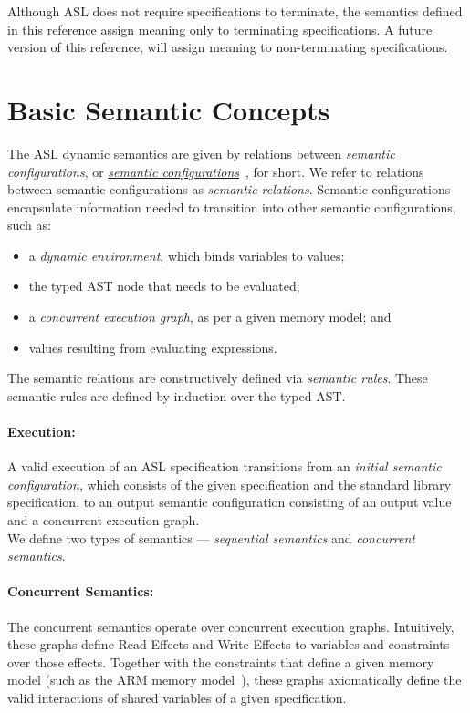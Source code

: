 Although ASL does not require specifications to terminate, the semantics defined in this
reference assign meaning only to terminating specifications.
A future version of this reference, will assign meaning to non-terminating specifications.

\section{Basic Semantic Concepts}
The ASL dynamic semantics are given by relations between \emph{semantic configurations},
or \hyperlink{def-configuration}{\emph{semantic configurations}}~\cite{SemanticsWithApplicationsBook}, for short.
We refer to relations between semantic configurations as \emph{semantic relations}.
Semantic configurations encapsulate information needed to transition into other semantic configurations, such as:
\begin{itemize}
  \item a \emph{dynamic environment}, which binds variables to values;
  \item the typed AST node that needs to be evaluated;
  \item a \emph{concurrent execution graph}, as per a given memory model; and
  \item values resulting from evaluating expressions.
\end{itemize}
The semantic relations are constructively defined via \emph{semantic rules}.
These semantic rules are defined by induction over the typed AST.

\paragraph{Execution:}
A valid execution of an ASL specification transitions from an \emph{initial semantic configuration},
which consists of the given specification and the standard library specification, to an output semantic configuration
consisting of an output value and a concurrent execution graph.\\

We define two types of semantics --- \emph{sequential semantics} and \emph{concurrent semantics}.

\paragraph{Concurrent Semantics:}
The concurrent semantics operate over concurrent execution graphs.
Intuitively, these graphs define Read Effects and Write Effects to variables and constraints over those effects.
Together with the constraints that define a given memory model (such as the ARM memory model~\cite{AlglaveDGHM21}),
these graphs axiomatically define
the valid interactions of shared variables of a given specification.

